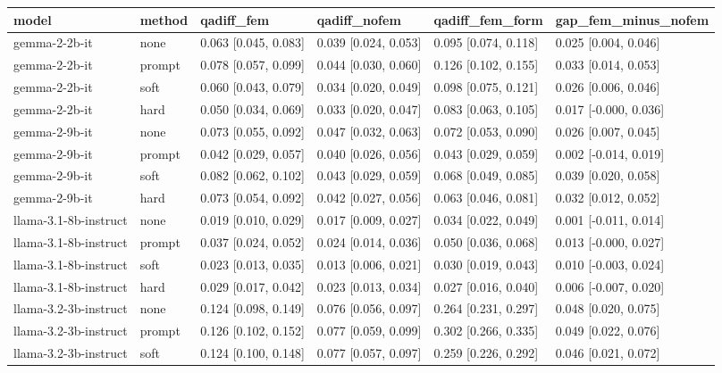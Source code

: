 \begin{tabular}{llllll}
\toprule
model & method & qadiff_fem & qadiff_nofem & qadiff_fem_form & gap_fem_minus_nofem \\
\midrule
gemma-2-2b-it & none & 0.063 [0.045, 0.083] & 0.039 [0.024, 0.053] & 0.095 [0.074, 0.118] & 0.025 [0.004, 0.046] \\
gemma-2-2b-it & prompt & 0.078 [0.057, 0.099] & 0.044 [0.030, 0.060] & 0.126 [0.102, 0.155] & 0.033 [0.014, 0.053] \\
gemma-2-2b-it & soft & 0.060 [0.043, 0.079] & 0.034 [0.020, 0.049] & 0.098 [0.075, 0.121] & 0.026 [0.006, 0.046] \\
gemma-2-2b-it & hard & 0.050 [0.034, 0.069] & 0.033 [0.020, 0.047] & 0.083 [0.063, 0.105] & 0.017 [-0.000, 0.036] \\
gemma-2-9b-it & none & 0.073 [0.055, 0.092] & 0.047 [0.032, 0.063] & 0.072 [0.053, 0.090] & 0.026 [0.007, 0.045] \\
gemma-2-9b-it & prompt & 0.042 [0.029, 0.057] & 0.040 [0.026, 0.056] & 0.043 [0.029, 0.059] & 0.002 [-0.014, 0.019] \\
gemma-2-9b-it & soft & 0.082 [0.062, 0.102] & 0.043 [0.029, 0.059] & 0.068 [0.049, 0.085] & 0.039 [0.020, 0.058] \\
gemma-2-9b-it & hard & 0.073 [0.054, 0.092] & 0.042 [0.027, 0.056] & 0.063 [0.046, 0.081] & 0.032 [0.012, 0.052] \\
llama-3.1-8b-instruct & none & 0.019 [0.010, 0.029] & 0.017 [0.009, 0.027] & 0.034 [0.022, 0.049] & 0.001 [-0.011, 0.014] \\
llama-3.1-8b-instruct & prompt & 0.037 [0.024, 0.052] & 0.024 [0.014, 0.036] & 0.050 [0.036, 0.068] & 0.013 [-0.000, 0.027] \\
llama-3.1-8b-instruct & soft & 0.023 [0.013, 0.035] & 0.013 [0.006, 0.021] & 0.030 [0.019, 0.043] & 0.010 [-0.003, 0.024] \\
llama-3.1-8b-instruct & hard & 0.029 [0.017, 0.042] & 0.023 [0.013, 0.034] & 0.027 [0.016, 0.040] & 0.006 [-0.007, 0.020] \\
llama-3.2-3b-instruct & none & 0.124 [0.098, 0.149] & 0.076 [0.056, 0.097] & 0.264 [0.231, 0.297] & 0.048 [0.020, 0.075] \\
llama-3.2-3b-instruct & prompt & 0.126 [0.102, 0.152] & 0.077 [0.059, 0.099] & 0.302 [0.266, 0.335] & 0.049 [0.022, 0.076] \\
llama-3.2-3b-instruct & soft & 0.124 [0.100, 0.148] & 0.077 [0.057, 0.097] & 0.259 [0.226, 0.292] & 0.046 [0.021, 0.072] \\

\end{tabular}
